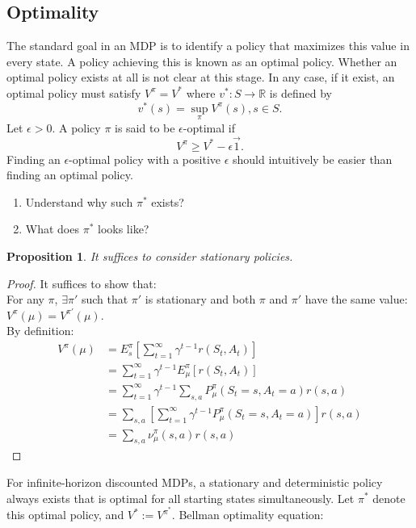 \documentclass{report}
\newtheorem{proposition}{Proposition}[theorem]
\begin{document}
\subsection{Optimality}
The standard goal in an MDP is to identify a policy that maximizes this value in every state. A policy achieving this is known as an optimal policy. Whether an optimal policy exists at all is not clear at this stage. In any case, if it exist, an optimal policy must satisfy $V^{\pi}=V^*$ where $v^*:S\rightarrow \mathbb{R}$ is defined by \[
v^*(s)=\sup_{\pi}V^{\pi}(s),s\in S.  
\]
Let $\epsilon>0$. A policy $\pi$ is said to be $\epsilon$-optimal if \[
V^{\pi} \geq V^*-\epsilon\Vec{1}.
\]
Finding an $\epsilon$-optimal policy with a positive $\epsilon$ should intuitively be easier than finding an optimal policy.
\begin{enumerate}
    \item Understand why such $\pi^*$ exists?
    \item What does $\pi^*$ looks like?
\end{enumerate}
\begin{proposition}
It suffices to consider stationary policies.
\end{proposition}
\begin{proof}
    It suffices to show that:\\
    For any $\pi$, $\exists \pi'$ such that $\pi'$ is stationary and both $\pi$ and $\pi'$ have the same value: $V^{\pi}(\mu)=V^{\pi'}(\mu)$.\\
    By definition:
    \begin{equation*}
        \begin{split}
            V^{\pi}(\mu)&=E^{\pi}_{s}[\sum_{t=1}^{\infty}\gamma^{t-1}r(S_t,A_t)]\\
            &=\sum_{t=1}^{\infty}\gamma^{t-1}E_{\mu}^{\pi}[r(S_t,A_t)]\\
            &=\sum_{t=1}^{\infty}\gamma^{t-1}\sum_{s,a}P_{\mu}^{\pi}(S_t=s,A_t=a)r(s,a)\\
            &=\sum_{s,a}[\sum_{t=1}^{\infty}\gamma^{t-1}P_{\mu}^{\pi}(S_t=s,A_t=a)]r(s,a)\\
            &=\sum_{s,a}\nu_{\mu}^{\pi}(s,a)r(s,a)
        \end{split}
    \end{equation*}
\end{proof}
For infinite-horizon discounted MDPs, a
stationary and deterministic policy always exists that is optimal for all starting states simultaneously. Let $\pi^*$ denote this optimal policy, and $V^* := V^{\pi^*}$. Bellman optimality equation: 
\end{document}
